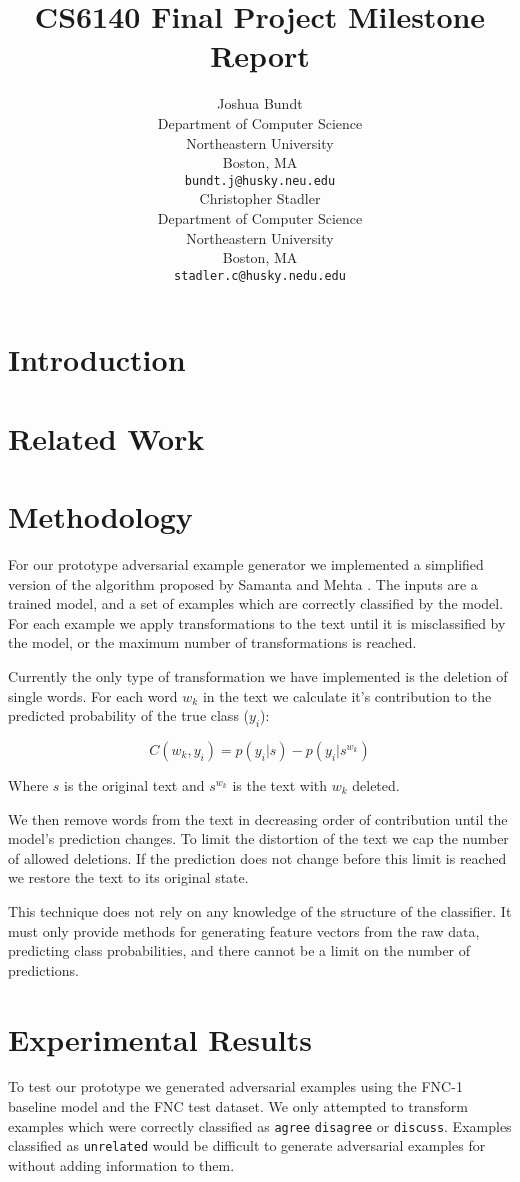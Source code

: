 \documentclass{article}
\title{CS6140 Final Project Milestone Report}
\author{
  Joshua Bundt \\
  Department of Computer Science\\
  Northeastern University\\
  Boston, MA \\
  \texttt{bundt.j@husky.neu.edu} \\
  \And
  Christopher Stadler \\
  Department of Computer Science \\
  Northeastern University \\
  Boston, MA \\
  \texttt{stadler.c@husky.nedu.edu} \\
}
\begin{document}

\maketitle

\section{Introduction}

\section{Related Work}

\section{Methodology}
For our prototype adversarial example generator we implemented a simplified version of the algorithm proposed by Samanta and Mehta \cite{samanta_towards_2017}. The inputs are a trained model, and a set of examples which are correctly classified by the model. For each example we apply transformations to the text until it is misclassified by the model, or the maximum number of transformations is reached.

Currently the only type of transformation we have implemented is the deletion of single words. For each word $w_k$ in the text we calculate it's contribution to the predicted probability of the true class ($y_i$):

\begin{equation}
    C(w_k, y_i) = p(y_i | s) - p(y_i | s^{w_k})
\end{equation}

Where $s$ is the original text and $s^{w_k}$ is the text with $w_k$ deleted.

We then remove words from the text in decreasing order of contribution until the model's prediction changes. To limit the distortion of the text we cap the number of allowed deletions. If the prediction does not change before this limit is reached we restore the text to its original state.

This technique does not rely on any knowledge of the structure of the classifier. It must only provide methods for generating feature vectors from the raw data, predicting class probabilities, and there cannot be a limit on the number of predictions.

\section{Experimental Results}
To test our prototype we generated adversarial examples using the FNC-1 baseline model \cite{noauthor_baseline_2018} and the FNC test dataset. We only attempted to transform examples which were correctly classified as \texttt{agree} \texttt{disagree} or \texttt{discuss}. Examples classified as \texttt{unrelated} would be difficult to generate adversarial examples for without adding information to them.
\end{document}
